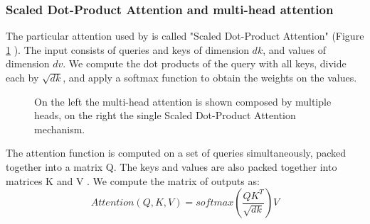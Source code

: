 \subsubsection{Scaled Dot-Product Attention and multi-head attention}
The particular attention used by \cite{vaswani2017attention} is called "Scaled Dot-Product Attention" (Figure \ref{fig:transformer_attention} ). The input consists of queries and keys of dimension $dk$, and values of dimension $dv$. We compute the dot products of the query with all keys, divide each by $\sqrt{dk}$, and apply a softmax function to obtain the weights on the values.
\begin{figure}[H]%
    \centering
    \caption{On the left the multi-head attention is shown composed by multiple heads, on the right the single Scaled Dot-Product Attention mechanism.}
    \label{fig:transformer_attention}%
\end{figure}
The attention function is computed on a set of queries simultaneously, packed together into a matrix Q. The keys and values are also packed together into matrices K and V . We compute the matrix of outputs as:
$$Attention(Q, K, V ) = softmax(\frac{QK^T}{\sqrt{dk}})V$$
